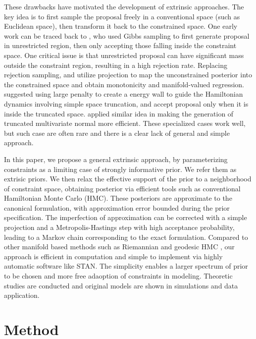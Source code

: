 \documentclass[10pt]{article}
\DeclareMathOperator{\1}{\mathbbm{1}}
\begin{document}
These drawbacks have motivated the development of extrinsic approaches. The key idea is to first sample the proposal freely in a conventional space (such as Euclidean space), then transform it back to the constrained space. One early work can be traced back to \cite{gelfand1992bayesian}, who used Gibbs sampling to first generate proposal in unrestricted region, then only accepting those falling inside the constraint space. One critical issue is that unrestricted proposal can have significant mass outside the constraint region, resulting in a high rejection rate. Replacing rejection sampling, \cite{lin2014monogp} and \cite{lin2016extrinsic} utilize projection to map the unconstrained posterior into the constrained space and obtain monotonicity and manifold-valued regression. \cite{neal2011mcmc} suggested using large penalty to create a energy wall to guide the Hamiltonian dynamics involving simple space truncation, and accept proposal only when it is inside the truncated space. \cite{pakman2014exact} applied similar idea in making the generation of truncated multivariate normal more efficient. These specialized cases work well, but such case are often rare and there is a clear lack of general and simple approach. 

In this paper, we propose a general extrinsic approach, by parameterizing constraints as a limiting case of strongly informative prior. We refer them as extrisic priors. We then relax the effective support of the prior to a neighborhood of constraint space, obtaining posterior via efficient tools such as conventional Hamiltonian Monte Carlo (HMC). These posteriors are approximate to the canonical formulation, with approximation error bounded during the prior specification. The imperfection of approximation can be corrected with a simple projection and a Metropolis-Hastings step with high acceptance probability, leading to a Markov chain corresponding to the exact formulation. Compared to other manifold based methods such as Riemannian and geodesic HMC \citep{girolami2011riemann,byrne2013geodesic}, our approach is efficient in computation and simple to implement via highly automatic software like STAN. The simplicity enables a larger spectrum of prior to be chosen and more free adaoption of constraints in modeling. Theoretic studies are conducted and original models are shown in simulations and data application.

\section{Method}
\end{document}
